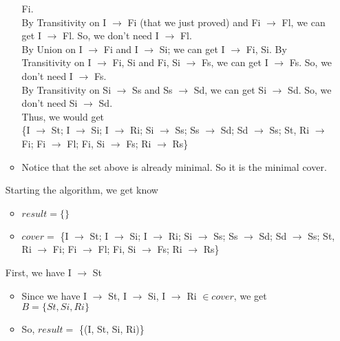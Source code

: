 \documentclass[12pt]{article}
\begin{document}
\begin{enumerate}
\begin{itemize}
                Fi. \\
                By Transitivity on I $\longrightarrow$ Fi (that we just proved)
                and Fi $\longrightarrow$ Fl, we can get I $\longrightarrow$ Fl.
                So, we don't need I $\longrightarrow$ Fl. \\
                By Union on I $\longrightarrow$ Fi and I $\longrightarrow$ Si;
                we can get I $\longrightarrow$ Fi, Si. By Transitivity on I
                $\longrightarrow$ Fi, Si and Fi, Si $\longrightarrow$ Fs, we can
                get I $\longrightarrow$ Fs. So, we don't need I
                $\longrightarrow$ Fs. \\
                By Transitivity on Si $\longrightarrow$ Ss and Ss
                $\longrightarrow$ Sd, we can get Si $\longrightarrow$ Sd. So, we
                don't need Si $\longrightarrow$ Sd. \\
                Thus, we would get \\
                \{I $\longrightarrow$ St; I $\longrightarrow$ Si; I
                $\longrightarrow$ Ri; Si $\longrightarrow$ Ss; Ss
                $\longrightarrow$ Sd; Sd $\longrightarrow$ Ss; St, Ri
                $\longrightarrow$ Fi; Fi $\longrightarrow$ Fl; Fi, Si
                $\longrightarrow$ Fs; Ri $\longrightarrow$ Rs\}
          \item Notice that the set above is already minimal. So it is the
                minimal cover.
        \end{itemize}
        Starting the algorithm, we get know 
        \begin{itemize}
          \item $result = \{\}$
          \item $cover = $
                \{I $\longrightarrow$ St; I $\longrightarrow$ Si; I
                $\longrightarrow$ Ri; Si $\longrightarrow$ Ss; Ss
                $\longrightarrow$ Sd; Sd $\longrightarrow$ Ss; St, Ri
                $\longrightarrow$ Fi; Fi $\longrightarrow$ Fl; Fi, Si
                $\longrightarrow$ Fs; Ri $\longrightarrow$ Rs\}
        \end{itemize}
        First, we have I $\longrightarrow$ St
        \begin{itemize}
          \item Since we have I $\longrightarrow$ St, I $\longrightarrow$ Si, I
                $\longrightarrow$ Ri $\in cover$, we get $B = \{St, Si, Ri\}$
          \item So, $result =$ \{(I, St, Si, Ri)\}

\end{itemize}
\end{enumerate}
\end{document}
